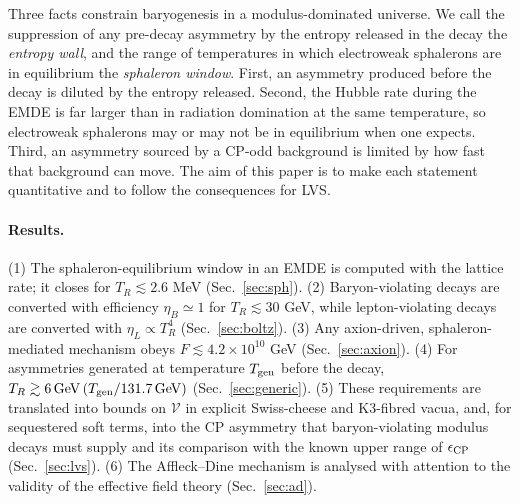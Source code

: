 \documentclass[11pt]{article}
\newcommand{\vol}{\mathcal{V}}
\begin{document}
Three facts constrain baryogenesis in a modulus-dominated universe. We call the suppression of any pre-decay asymmetry by the entropy released in the decay the \emph{entropy wall}, and the range of temperatures in which electroweak sphalerons are in equilibrium the \emph{sphaleron window}. First, an asymmetry produced before the decay is diluted by the entropy released. Second, the Hubble rate during the EMDE is far larger than in radiation domination at the same temperature, so electroweak sphalerons may or may not be in equilibrium when one expects. Third, an asymmetry sourced by a CP-odd background is limited by how fast that background can move. The aim of this paper is to make each statement quantitative and to follow the consequences for LVS.

\paragraph*{Results.}
(1) The sphaleron-equilibrium window in an EMDE is computed with the lattice rate; it closes for $T_R\lesssim 2.6$ MeV (Sec.~\ref{sec:sph}). (2) Baryon-violating decays are converted with efficiency $\eta_B\simeq1$ for $T_R\lesssim30$ GeV, while lepton-violating decays are converted with $\eta_L\propto T_R^4$ (Sec.~\ref{sec:boltz}). (3) Any axion-driven, sphaleron-mediated mechanism obeys $F\lesssim4.2\times10^{10}$ GeV (Sec.~\ref{sec:axion}). (4) For asymmetries generated at temperature $T_{\rm gen}$ before the decay, $T_R\gtrsim 6\,{\rm GeV}\,(T_{\rm gen}/131.7\,{\rm GeV})$ (Sec.~\ref{sec:generic}). (5) These requirements are translated into bounds on $\vol$ in explicit Swiss-cheese and K3-fibred vacua, and, for sequestered soft terms, into the CP asymmetry that baryon-violating modulus decays must supply and its comparison with the known upper range of $\epsilon_{\rm CP}$ (Sec.~\ref{sec:lvs}). (6) The Affleck--Dine mechanism is analysed with attention to the validity of the effective field theory (Sec.~\ref{sec:ad}).
\end{document}
